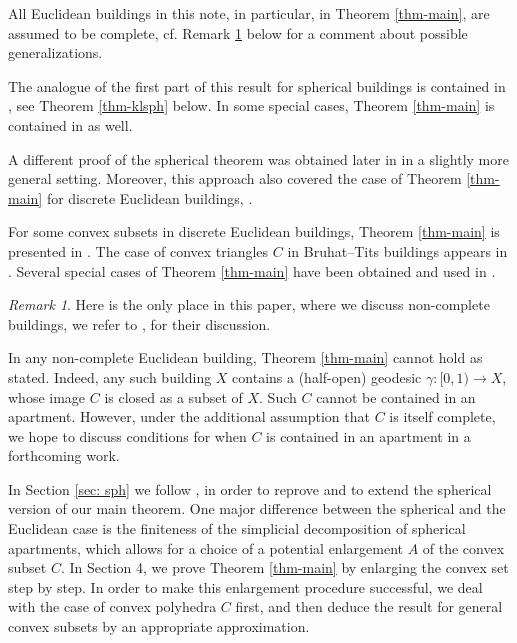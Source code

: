 \documentclass[12pt,leqno]{amsart}
\numberwithin{equation}{section}
\theoremstyle{definition}
\theoremstyle{remark}
\newtheorem{rem}{Remark}[section]
\begin{document}
 
 	All Euclidean buildings in this note, in particular, in Theorem \ref{thm-main}, are assumed to be complete, cf. Remark \ref{rem: non-complete} below for a comment about possible generalizations.
 	
 	

The analogue of the first part of this result  for spherical buildings is contained in   \cite{KleinerLeeb1}, see Theorem \ref{thm-klsph} below. 
In some special cases,  Theorem \ref{thm-main} is contained in \cite{KleinerLeeb1} as well.


A different proof of the spherical theorem  was obtained later in \cite[Proposition 1.3]{BL} in a slightly more general setting.  Moreover, this approach also covered the case of Theorem \ref{thm-main} for discrete Euclidean buildings, \cite[Remark 1.4]{BL}. 

For some convex subsets in discrete Euclidean buildings,  Theorem \ref{thm-main} is presented in \cite[Theorem 11.53]{Abram}. The case of convex triangles $C$ in Bruhat--Tits buildings appears in \cite[Exercise 2.3.10.3]{Rousseau}.  Several  special cases of  Theorem \ref{thm-main} have been obtained and used in \cite{BM}.


 \begin{rem} \label{rem: non-complete}
	Here is the only place in this paper, where we discuss non-complete buildings, we refer to  \cite{Parreau}, \cite{Str} for their discussion.

	In any non-complete Euclidean building, Theorem \ref{thm-main} cannot hold as stated. Indeed, any such building $X$ contains a (half-open) geodesic $\gamma:[0,1) \to X$, whose image $C$ is closed as a subset of $X$.  Such $C$ cannot be contained in an apartment. 
	However, under the additional assumption that $C$ is itself complete, we hope to discuss conditions for when $C$ is contained in an apartment in a forthcoming work.  
\end{rem}

 
  In Section \ref{sec: sph} we follow \cite{KleinerLeeb1}, in order to  reprove and  to extend the spherical version of our main theorem.   One major difference between the spherical and the Euclidean case is  the  finiteness of the simplicial decomposition of spherical apartments, which allows for a choice of a potential enlargement $A$  of the convex subset $C$.  In Section 4,  we prove Theorem \ref{thm-main} by enlarging the convex set step by step.  In order to make this enlargement procedure  successful, we deal with the case of convex polyhedra $C$ first, 
  and then deduce the result for  general convex subsets  by an appropriate approximation. 
  
\end{document}
